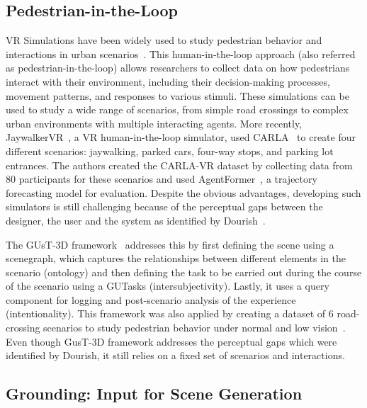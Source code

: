 \documentclass{article}
\begin{document}
\subsection{Pedestrian-in-the-Loop}

VR Simulations have been widely used to study pedestrian behavior and interactions in urban scenarios~\cite{wu2018using,tran2021review,mukoya2024jaywalkervr,schneider2020virtually}. This human-in-the-loop approach (also referred as pedestrian-in-the-loop\cite{hartmann2017pedestrian}) allows researchers to collect data on how pedestrians interact with their environment, including their decision-making processes, movement patterns, and responses to various stimuli. These simulations can be used to study a wide range of scenarios, from simple road crossings to complex urban environments with multiple interacting agents. More recently, JaywalkerVR~\cite{mukoya2024jaywalkervr}, a VR human-in-the-loop simulator, used CARLA~\cite{dosovitskiy2017carla} to create four different scenarios: jaywalking, parked cars, four-way stops, and parking lot entrances. The authors created the CARLA-VR dataset by collecting data from 80 participants for these scenarios and used AgentFormer~\cite{yuan2021agentformer}, a trajectory forecasting model for evaluation. Despite the obvious advantages, developing such simulators is still challenging because of the perceptual gaps between the designer, the user and the system as identified by Dourish~\cite{dourish2001action}.

The GUsT-3D framework~\cite{wu2022designing} addresses this by first defining the scene using a scenegraph, which captures the relationships between different elements in the scenario (ontology) and then defining the task to be carried out during the course of the scenario using a GUTasks (intersubjectivity). Lastly, it uses a query component for logging and post-scenario analysis of the experience (intentionality). This framework was also applied by creating a dataset of 6 road-crossing scenarios to study pedestrian behavior under normal and low vision~\cite{wu2023exploring}. Even though GusT-3D framework addresses the perceptual gaps which were identified by Dourish, it still relies on a fixed set of scenarios and interactions.

\subsection{Grounding: Input for Scene Generation}
\end{document}

